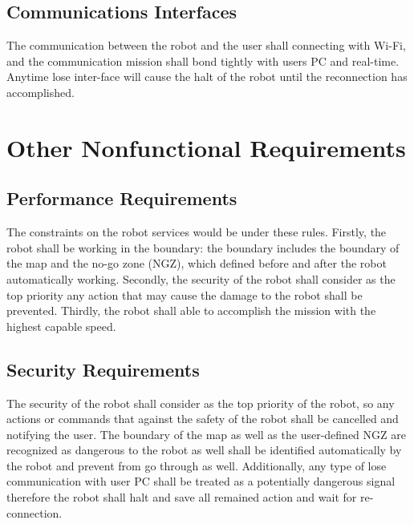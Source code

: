 \documentclass[11pt, a4paper]{article}
\begin{document}
\subsection{Communications Interfaces}
The communication between the robot and the user shall connecting with Wi-Fi, and the communication mission shall bond tightly with users PC and real-time. Anytime lose inter-face will cause the halt of the robot until the reconnection has accomplished.

\section{Other Nonfunctional Requirements}
\subsection{Performance Requirements}
The constraints on the robot services would be under these rules.  Firstly, the robot shall be working in the boundary: the boundary includes the boundary of the map and the no-go zone (NGZ), which defined before and after the robot automatically working.  Secondly, the security of the robot shall consider as the top priority any action that may cause the damage to the robot shall be prevented. Thirdly, the robot shall able to accomplish the mission with the highest capable speed.


\subsection{Security Requirements}
The security of the robot shall consider as the top priority of the robot, so any actions or commands that against the safety of the robot shall be cancelled and notifying the user.  The boundary of the map as well as the user-defined NGZ are recognized as dangerous to the robot as well shall be identified automatically by the robot and prevent from go through as well.  Additionally, any type of lose communication with user PC shall be treated as a potentially dangerous signal therefore the robot shall halt and save all remained action and wait for re-connection.
\end{document}
